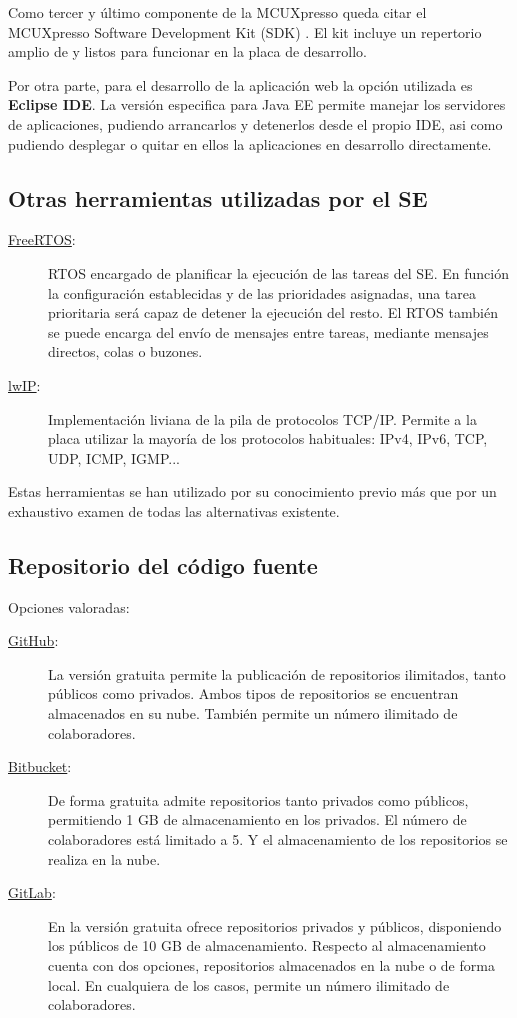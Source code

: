 Como tercer y último componente de la  MCUXpresso queda
citar el MCUXpresso Software Development Kit (SDK) \cite{webpage:sdk}. El kit
incluye un repertorio amplio de  y
 listos para funcionar en la placa de desarrollo.

Por otra parte, para el desarrollo de la aplicación web la opción utilizada es
\textbf{Eclipse IDE}. La versión especifica para Java EE permite manejar los
servidores de aplicaciones, pudiendo arrancarlos y detenerlos desde el propio
IDE, asi como pudiendo desplegar o quitar en ellos la aplicaciones en desarrollo
directamente.

\subsection{Otras herramientas utilizadas por el SE}{\label{sec:otros}}
\begin{description}
  \item[\href{https://www.freertos.org/}{FreeRTOS}:] RTOS encargado de
  planificar la ejecución de las tareas del SE. En función la configuración
  establecidas y de las prioridades asignadas, una tarea prioritaria será capaz
  de detener la ejecución del resto. El RTOS también se puede encarga del envío
  de mensajes entre tareas, mediante mensajes directos, colas o buzones.
  \item[\href{https://savannah.nongnu.org/projects/lwip/}{lwIP}:] Implementación
  liviana de la pila de protocolos TCP/IP. Permite a la placa utilizar la
  mayoría de los protocolos habituales: IPv4, IPv6, TCP, UDP, ICMP, IGMP...
\end{description}

Estas herramientas se han utilizado por su conocimiento previo más que por 
un exhaustivo examen de todas las alternativas existente.

\subsection{Repositorio del código fuente}{\label{sec:vcs}}
Opciones valoradas:
\begin{description}
  \item[\href{https://github.com/}{GitHub}:] La versión gratuita permite la
  publicación de repositorios ilimitados, tanto públicos como privados. Ambos
  tipos de repositorios se encuentran almacenados en su nube. También permite
  un número ilimitado de colaboradores.
  \item[\href{https://bitbucket.org/}{Bitbucket}:] De forma gratuita admite
  repositorios tanto privados como públicos, permitiendo 1 GB de almacenamiento
  en los privados. El número de colaboradores está limitado a 5. Y el
  almacenamiento de los repositorios se realiza en la nube.
  \item[\href{https://about.gitlab.com/}{GitLab}:] En la versión gratuita ofrece
  repositorios privados y públicos, disponiendo los públicos de 10 GB de
  almacenamiento. Respecto al almacenamiento cuenta con dos opciones,
  repositorios almacenados en la nube o de forma local. En cualquiera de los
  casos, permite un número ilimitado de colaboradores.
\end{description}

